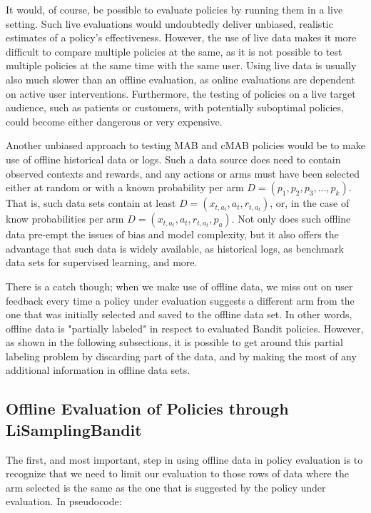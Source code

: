\documentclass[nojss]{jss}\usepackage[]{graphicx}\usepackage[]{color}
\begin{document}
It would, of course, be possible to evaluate policies by running them in a live setting. Such live evaluations would undoubtedly deliver unbiased, realistic estimates of a policy's effectiveness. However, the use of live data makes it more difficult to compare multiple policies at the same, as it is not possible to test multiple policies at the same time with the same user. Using live data is usually also much slower than an offline evaluation, as online evaluations are dependent on active user interventions. Furthermore, the testing of policies on a live target audience, such as patients or customers, with potentially suboptimal policies, could become either dangerous or very expensive.

Another unbiased approach to testing MAB and cMAB policies would be to make use of offline historical data or logs. Such a data source does need to contain observed contexts and rewards, and any actions or arms must have been selected either at random or with a known probability per arm \( D = (p_1,p_2,p_3,...,p_k) \). That is, such data sets contain at least \( D = (x_{t,a_t},a_{t},r_{t,a_t}) \), or, in the case of know probabilities per arm \( D = (x_{t,a_t},a_{t},r_{t,a_t},p_a) \). Not only does such offline data pre-empt the issues of bias and model complexity, but it also offers the advantage that such data is widely available, as historical logs, as benchmark data sets for supervised learning, and more.

There is a catch though; when we make use of offline data, we miss out on user feedback every time a policy under evaluation suggests a different arm from the one that was initially selected and saved to the offline data set. In other words, offline data is "partially labeled" in respect to evaluated Bandit policies. However, as shown in the following subsections, it is possible to get around this partial labeling problem by discarding part of the data, and by making the most of any additional information in offline data sets.

\subsection{Offline Evaluation of Policies through LiSamplingBandit}

The first, and most important, step in using offline data in policy evaluation is to recognize that we need to limit our evaluation to those rows of data where the arm selected is the same as the one that is suggested by the policy under evaluation. In pseudocode:
\end{document}
